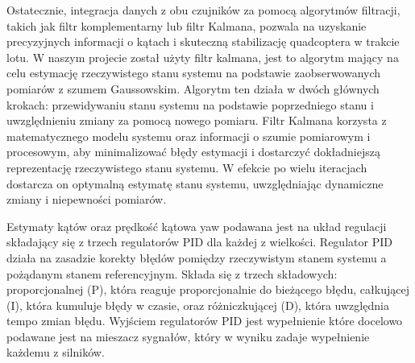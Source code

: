 {Ostatecznie, integracja danych z obu czujników za pomocą algorytmów filtracji, takich jak filtr komplementarny lub filtr Kalmana, pozwala na uzyskanie precyzyjnych informacji o kątach i skuteczną stabilizację quadcoptera w trakcie lotu. W naszym projecie został użyty filtr kalmana, jest to algorytm mający na celu estymację rzeczywistego stanu systemu na podstawie zaobserwowanych pomiarów z szumem Gaussowskim. Algorytm ten działa w dwóch głównych krokach: przewidywaniu stanu systemu na podstawie poprzedniego stanu i uwzględnieniu zmiany za pomocą nowego pomiaru. Filtr Kalmana korzysta z matematycznego modelu systemu oraz informacji o szumie pomiarowym i procesowym, aby minimalizować błędy estymacji i dostarczyć dokładniejszą reprezentację rzeczywistego stanu systemu. W efekcie po wielu iteracjach dostarcza on optymalną estymatę stanu systemu, uwzględniając dynamiczne zmiany i niepewności pomiarów.

Estymaty kątów oraz prędkość kątowa yaw podawana jest na układ regulacji składający się z trzech regulatorów PID dla każdej z wielkości.
Regulator PID działa na zasadzie korekty błędów pomiędzy rzeczywistym stanem systemu a pożądanym stanem referencyjnym. Składa się z trzech składowych: proporcjonalnej (P), która reaguje proporcjonalnie do bieżącego błędu, całkującej (I), która kumuluje błędy w czasie, oraz różniczkującej (D), która uwzględnia tempo zmian błędu. Wyjściem regulatorów PID jest wypełnienie które docelowo podawane jest na mieszacz sygnałów, który w wyniku zadaje wypełnienie każdemu z silników.}
